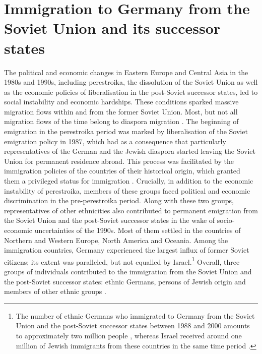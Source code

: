\section{Immigration to Germany from the Soviet Union and its successor states}
The political and economic changes in Eastern Europe and Central Asia in the 1980s and 1990s, including perestroika, the dissolution of the Soviet Union as well as the economic policies of liberalisation in the post-Soviet successor states, led to social instability and economic hardships. These conditions sparked massive migration flows within and from the former Soviet Union. Most, but not all migration flows of the time belong to diaspora migration \citep{heleniak03}. The beginning of emigration in the perestroika period was marked by liberalisation of the Soviet emigration policy in 1987, which had as a consequence that particularly representatives of the German and the Jewish diaspora started leaving the Soviet Union for permanent residence abroad. This process was facilitated by the immigration policies of the countries of their historical origin, which granted them a privileged status for immigration \citep[cf.][]{deTinguy}. Crucially, in addition to the economic instability of perestroika, members of these groups faced political and economic discrimination in the pre-perestroika period. Along with these two groups, representatives of other ethnicities also contributed to permanent emigration from the Soviet Union and the post-Soviet successor states in the wake of socio-economic uncertainties of the 1990s. Most of them settled in the countries of Northern and Western Europe, North America and Oceania. Among the immigration countries, Germany experienced the largest influx of former Soviet citizens; its extent was paralleled, but not equalled by Israel.\footnote{The number of ethnic Germans who immigrated to Germany from the Soviet Union and the post-Soviet successor states between 1988 and 2000 amounts to approximately two million people \citep{lederer97}, whereas Israel received around one million of Jewish immigrants from these countries in the same time period \citep{tolts}.} Overall, three groups of individuals contributed to the immigration from the Soviet Union and the post-Soviet successor states: ethnic Germans, persons of Jewish origin and members of other ethnic groups \citep[cf.][]{brehmer07}.

